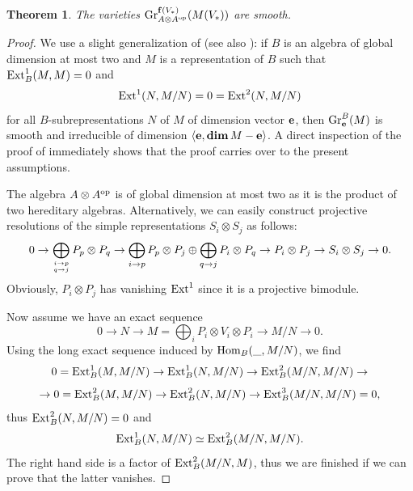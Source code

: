 \documentclass[12pt,a4paper]{amsart}
\numberwithin{equation}{section}
\newtheorem{thm}{Theorem}[section]
\theoremstyle{remark}
\begin{document}
\begin{thm}\label{thm:smoothness}
The varieties ${\rm Gr}^{{\bf f}(V_*)}_{A\otimes A^{\rm op}}(M(V_*))$ are smooth.
\end{thm}
\begin{proof}
We use a slight generalization of \cite[Proposition 7.1]{CFR13}
(see also \cite{CFR14}):  if $B$ is an algebra of global dimension at 
most two and $M$ is a representation of $B$ such that ${\rm Ext}^1_B(M,M)=0$ and 
\[
{\rm Ext}^1(N,M/N)=0={\rm Ext}^2(N,M/N)
\]
for all $B$-subrepresentations $N$ of $M$ of dimension vector 
${\bf e}$, then ${\rm Gr}_{\bf e}^B(M)$ is smooth and irreducible of dimension 
$\langle{\bf e},{\rm\bf dim}\, M-{\bf e}\rangle$. A direct inspection of the proof of \cite[Proposition 7.1]{CFR13} immediately shows that the proof carries over to the present assumptions.

The algebra $A\otimes A^{\rm op}$ is of global dimension at most two as it is the product of two hereditary algebras. Alternatively, we can easily construct projective resolutions of the simple representations $S_i\otimes S_j$ as follows:
$$0\rightarrow\bigoplus_{{i\rightarrow p}\atop{q\rightarrow j}}P_p\otimes P_q\rightarrow\bigoplus_{i\rightarrow p}P_p\otimes P_j\oplus\bigoplus_{q\rightarrow j}P_i\otimes P_q\rightarrow P_i\otimes P_j\rightarrow S_i\otimes S_j\rightarrow 0.$$
Obviously, $P_i\otimes P_j$ has vanishing ${\rm Ext}^1$ since it is a projective bimodule.

Now assume we have an exact sequence
$$0\rightarrow N\rightarrow M=\bigoplus_iP_i\otimes V_i\otimes P_i\rightarrow M/N\rightarrow 0.$$
Using the long exact sequence induced by ${\rm Hom}_B(\_,M/N)$, we find
$$0={\rm Ext}_B^1(M,M/N)\rightarrow{\rm Ext}^1_B(N,M/N)\rightarrow{\rm Ext}_B^2(M/N,M/N)\rightarrow$$
$$\rightarrow 0={\rm Ext}_B^2(M,M/N)\rightarrow{\rm Ext}^2_B(N,M/N)\rightarrow{\rm Ext}^3_B(M/N,M/N)=0,$$
thus ${\rm Ext}_B^2(N,M/N)=0$ and $${\rm Ext}^1_B(N,M/N)\simeq{\rm Ext}_B^2(M/N,M/N).$$ 
The right hand side is a factor of ${\rm Ext}_B^2(M/N,M)$, thus we are finished if we can prove that 
the latter vanishes. 


\end{proof}
\end{document}
